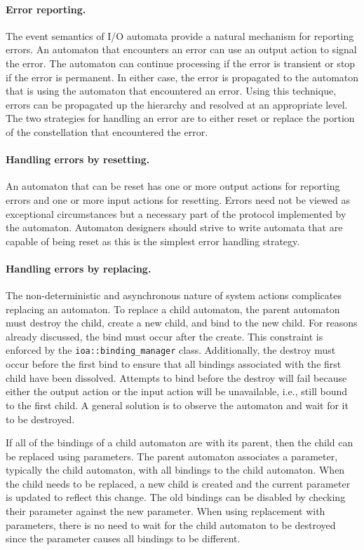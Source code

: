 \paragraph{Error reporting.}
The event semantics of I/O automata provide a natural mechanism for reporting errors.
An automaton that encounters an error can use an output action to signal the error.
The automaton can continue processing if the error is transient or stop if the error is permanent.
In either case, the error is propagated to the automaton that is using the automaton that encountered an error.
Using this technique, errors can be propagated up the hierarchy and resolved at an appropriate level.
The two strategies for handling an error are to either reset or replace the portion of the constellation that encountered the error.

\paragraph{Handling errors by resetting.}
An automaton that can be reset has one or more output actions for reporting errors and one or more input actions for resetting.
Errors need not be viewed as exceptional circumstances but a necessary part of the protocol implemented by the automaton.
Automaton designers should strive to write automata that are capable of being reset as this is the simplest error handling strategy.

\paragraph{Handling errors by replacing.}
The non-deterministic and asynchronous nature of system actions complicates replacing an automaton.
To replace a child automaton, the parent automaton must destroy the child, create a new child, and bind to the new child.
For reasons already discussed, the bind must occur after the create.
This constraint is enforced by the \verb+ioa::binding_manager+ class.
Additionally, the destroy must occur before the first bind to ensure that all bindings associated with the first child have been dissolved.
Attempts to bind before the destroy will fail because either the output action or the input action will be unavailable, i.e., still bound to the first child.
A general solution is to observe the automaton and wait for it to be destroyed.

If all of the bindings of a child automaton are with its parent, then the child can be replaced using parameters.
The parent automaton associates a parameter, typically the child automaton, with all bindings to the child automaton.
When the child needs to be replaced, a new child is created and the current parameter is updated to reflect this change.
The old bindings can be disabled by checking their parameter against the new parameter.
When using replacement with parameters, there is no need to wait for the child automaton to be destroyed since the parameter causes all bindings to be different.
